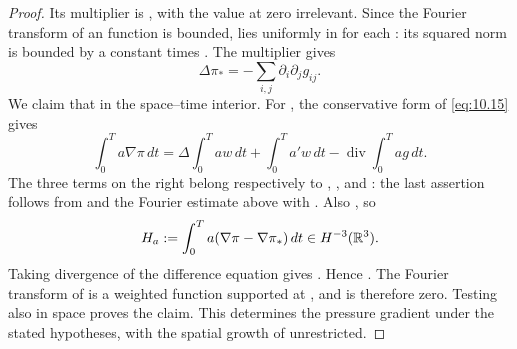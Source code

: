 \begin{proof}
%
Its multiplier is , with the value at zero
irrelevant. Since the Fourier transform of an  function is
bounded,  lies uniformly in
 for each : its squared
norm is bounded by a constant times
. The multiplier gives
\[
  \Delta\pi_*=-\sum_{i,j}\partial_i\partial_jg_{ij}.
\]
We claim that  in the space--time interior.
For , the conservative form of
\eqref{eq:10.15} gives
\[
  \int_0^T a\nabla\pi\,dt
  =\Delta\int_0^T aw\,dt+\int_0^T a'w\,dt
   -\operatorname{div}\int_0^T ag\,dt.
\]
The three terms on the right belong respectively to
, , and
: the last assertion follows from
 and the Fourier estimate above with
. Also
, so
\[
  H_a:=\int_0^T a(\nabla\pi-\nabla\pi_*)\,dt\in H^{-3}(\mathbb{R}^3).
\]
Taking divergence of the difference equation gives
.
Hence . The Fourier transform of
 is a weighted  function supported at
, and is therefore zero. Testing also in space proves the
claim. This determines the pressure gradient under the stated hypotheses, with the spatial
growth of  unrestricted.


\end{proof}
